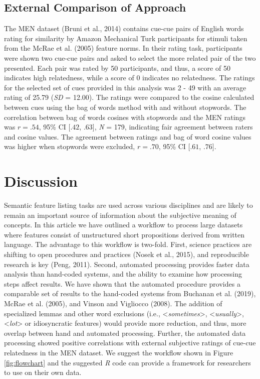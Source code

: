\documentclass[man]{apa6}
\begin{document}
\hypertarget{external-comparison-of-approach}{%
\subsection{External Comparison of Approach}\label{external-comparison-of-approach}}

The MEN dataset (Bruni et al., 2014) contains cue-cue pairs of English words rating for similarity by Amazon Mechanical Turk participants for stimuli taken from the McRae et al. (2005) feature norms. In their rating task, participants were shown two cue-cue pairs and asked to select the more related pair of the two presented. Each pair was rated by 50 participants, and thus, a score of 50 indicates high relatedness, while a score of 0 indicates no relatedness. The ratings for the selected set of cues provided in this analysis was 2 - 49 with an average rating of 25.79 (\emph{SD} = 12.00). The ratings were compared to the cosine calculated between cues using the bag of words method with and without stopwords. The correlation between bag of words cosines with stopwords and the MEN ratings was \(r = .54\), 95\% CI \([.42\), \(.63]\), \emph{N} = 179, indicating fair agreement between raters and cosine values. The agreement between ratings and bag of word cosine values was higher when stopwords were excluded, \(r = .70\), 95\% CI \([.61\), \(.76]\).

\hypertarget{discussion}{%
\section{Discussion}\label{discussion}}

Semantic feature listing tasks are used across various disciplines and are likely to remain an important source of information about the subjective meaning of concepts. In this article we have outlined a workflow to process large datasets where features consist of unstructured short propositions derived from written language. The advantage to this workflow is two-fold. First, science practices are shifting to open procedures and practices (Nosek et al., 2015), and reproducible research is key (Peng, 2011). Second, automated processing provides faster data analysis than hand-coded systems, and the ability to examine how processing steps affect results. We have shown that the automated procedure provides a comparable set of results to the hand-coded systems from Buchanan et al. (2019), McRae et al. (2005), and Vinson and Vigliocco (2008). The addition of specialized lemmas and other word exclusions (i.e., \textless{}\emph{sometimes}\textgreater{}, \textless{}\emph{usually}\textgreater{}, \textless{}\emph{lot}\textgreater{} or idiosyncratic features) would provide more reduction, and thus, more overlap between hand and automated processing. Further, the automated data processing showed positive correlations with external subjective ratings of cue-cue relatedness in the MEN dataset. We suggest the workflow shown in Figure \ref{fig:flowchart} and the suggested \emph{R} code can provide a framework for researchers to use on their own data.
\end{document}
